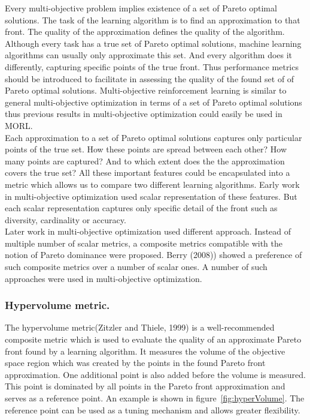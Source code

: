 Every multi-objective problem implies existence of a set of Pareto optimal solutions. The task of the learning algorithm is to find an approximation to that front. The quality of the approximation defines the quality of the algorithm. Although every task has a true set of Pareto optimal solutions, machine learning algorithms can usually only approximate this set. And every algorithm does it differently, capturing specific points of the true front. Thus performance metrics should be introduced to facilitate in assessing the quality of the found set of of Pareto optimal solutions.  Multi-objective reinforcement learning is similar to general multi-objective optimization in terms of a set of Pareto optimal solutions thus previous results in multi-objective optimization could easily be used in MORL. \\

Each approximation to a set of Pareto optimal solutions captures only particular points of the true set. How these points are spread between each other? How many points are captured? And to which extent does the the approximation covers the true set? All these important features could be encapsulated into a metric which allows us to compare two different learning algorithms. Early work in multi-objective optimization used scalar representation of these features. But each scalar representation captures only specific detail of the front such as diversity, cardinality or accuracy. \\

Later work in multi-objective optimization used different approach. Instead of multiple number of scalar metrics, a composite metrics compatible with the notion of Pareto dominance were proposed. Berry (2008)\cite{berry2008phd}) showed a preference of such composite metrics over a number of scalar ones. A number of such approaches were used in multi-objective optimization. \\

\subsubsection{Hypervolume metric.}

The hypervolume metric(Zitzler and Thiele, 1999\cite{zitzler1999pareto}) is a well-recommended composite metric which is used to evaluate the quality of an approximate Pareto front found by a learning algorithm. It measures the volume of the objective space region which was created by the points in the found Pareto front approximation. One additional point is also added before the volume is measured. This point is dominated by all points in the Pareto front approximation and serves as a reference point. An example is shown in figure~\ref{fig:hyperVolume}. The reference point can be used as a tuning mechanism and allows greater flexibility. \\


